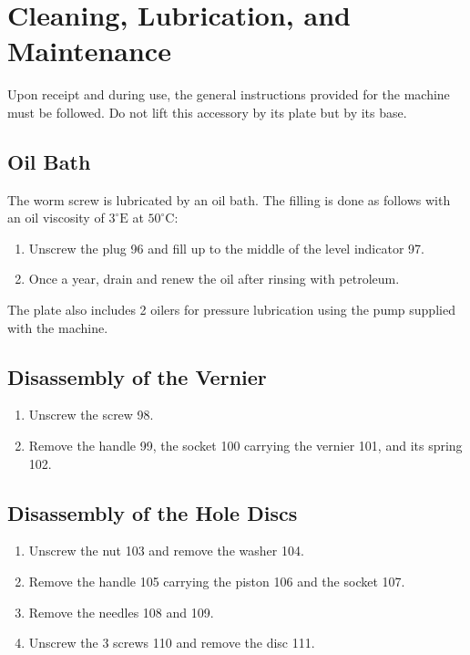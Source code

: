 \newpage
\section*{Cleaning, Lubrication, and Maintenance}

Upon receipt and during use, the general instructions provided for the machine must be followed.
Do not lift this accessory by its plate but by its base.

\subsection*{Oil Bath}
The worm screw is lubricated by an oil bath.
The filling is done as follows with an oil viscosity of \(3^\circ \mathrm{E}\) at \(50^\circ \mathrm{C}\):
\begin{enumerate}[label=\arabic*.]
    \item Unscrew the plug 96 and fill up to the middle of the level indicator 97.
    \item Once a year, drain and renew the oil after rinsing with petroleum.
\end{enumerate}
The plate also includes 2 oilers for pressure lubrication using the pump supplied with the machine.

\subsection*{Disassembly of the Vernier}
\begin{enumerate}[label=\arabic*.]
    \item Unscrew the screw 98.
    \item Remove the handle 99, the socket 100 carrying the vernier 101, and its spring 102.
\end{enumerate}

\subsection*{Disassembly of the Hole Discs}
\begin{enumerate}[label=\arabic*.]
    \item Unscrew the nut 103 and remove the washer 104.
    \item Remove the handle 105 carrying the piston 106 and the socket 107.
    \item Remove the needles 108 and 109.
    \item Unscrew the 3 screws 110 and remove the disc 111.
\end{enumerate}

